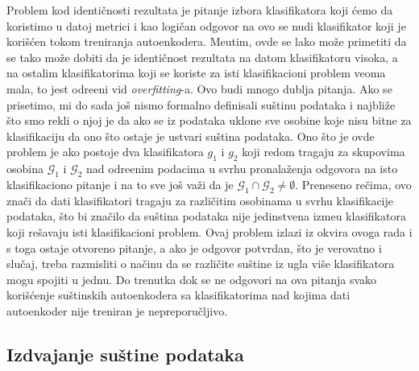 \documentclass{article}
\begin{document}
	Problem kod identi\v cnosti rezultata je pitanje izbora klasifikatora koji \'cemo da koristimo u datoj metrici i kao logi\v can odgovor na ovo se nudi klasifikator koji je kori\v s\'cen tokom treniranja autoenkodera.
	Me\dj utim, ovde se lako mo\v ze primetiti da se tako mo\v ze dobiti da je identi\v cnost rezultata na datom klasifikatoru visoka, a na ostalim klasifikatorima koji se koriste za isti klasifikacioni problem veoma mala, to jest odre\dj eni vid \emph{overfitting}-a. 
	Ovo budi mnogo dublja pitanja.
	Ako se prisetimo, mi do sada jo\v s nismo formalno definisali su\v stinu podataka i najbli\v ze \v sto smo rekli o njoj je da ako se iz podataka uklone sve osobine koje nisu bitne za klasifikaciju da ono \v sto ostaje je ustvari su\v stina podataka.
	Ono \v sto je ovde problem je ako postoje dva klasifikatora $g_1$ i $g_2$ koji redom tragaju za skupovima osobina $\mathcal{G}_1$ i $\mathcal{G}_2$ nad odre\dj enim podacima u svrhu pronala\v zenja odgovora na isto klasifikaciono pitanje i na to sve jo\v s va\v zi da je $\mathcal{G}_1 \cap \mathcal{G}_2 \ne \emptyset$.
	Preneseno re\v cima, ovo zna\v ci da dati klasifikatori tragaju za razli\v citim osobinama u svrhu klasifikacije podataka, \v sto bi zna\v cilo da su\v stina podataka nije jedinstvena izme\dj u klasifikatora koji re\v savaju isti klasifikacioni problem.
	Ovaj problem izlazi iz okvira ovoga rada i s toga ostaje otvoreno pitanje, a ako je odgovor potvrdan, \v sto je verovatno i slu\v caj, treba razmisliti o na\v cinu da se razli\v cite su\v stine iz ugla vi\v se klasifikatora mogu spojiti u jednu.
	Do trenutka dok se ne odgovori na ova pitanja svako kori\v s\'cenje su\v stinskih autoenkodera sa klasifikatorima nad kojima dati autoenkoder nije treniran je nepreporu\v cljivo.
	
	\subsection{Izdvajanje su\v stine podataka}
	
\end{document}
